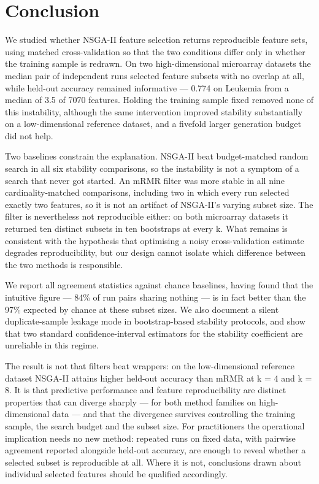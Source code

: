 \documentclass[conference]{IEEEtran}
\begin{document}
\section{Conclusion}

We studied whether NSGA-II feature selection returns reproducible feature sets, using matched cross-validation so that the two conditions differ only in whether the training sample is redrawn. On two high-dimensional microarray datasets the median pair of independent runs selected feature subsets with no overlap at all, while held-out accuracy remained informative --- 0.774 on Leukemia from a median of 3.5 of 7070 features. Holding the training sample fixed removed none of this instability, although the same intervention improved stability substantially on a low-dimensional reference dataset, and a fivefold larger generation budget did not help.

Two baselines constrain the explanation. NSGA-II beat budget-matched random search in all six stability comparisons, so the instability is not a symptom of a search that never got started. An mRMR filter was more stable in all nine cardinality-matched comparisons, including two in which every run selected exactly two features, so it is not an artifact of NSGA-II's varying subset size. The filter is nevertheless not reproducible either: on both microarray datasets it returned ten distinct subsets in ten bootstraps at every k. What remains is consistent with the hypothesis that optimising a noisy cross-validation estimate degrades reproducibility, but our design cannot isolate which difference between the two methods is responsible.

We report all agreement statistics against chance baselines, having found that the intuitive figure --- 84\% of run pairs sharing nothing --- is in fact better than the 97\% expected by chance at these subset sizes. We also document a silent duplicate-sample leakage mode in bootstrap-based stability protocols, and show that two standard confidence-interval estimators for the stability coefficient are unreliable in this regime.

The result is not that filters beat wrappers: on the low-dimensional reference dataset NSGA-II attains higher held-out accuracy than mRMR at k = 4 and k = 8. It is that predictive performance and feature reproducibility are distinct properties that can diverge sharply --- for both method families on high-dimensional data --- and that the divergence survives controlling the training sample, the search budget and the subset size. For practitioners the operational implication needs no new method: repeated runs on fixed data, with pairwise agreement reported alongside held-out accuracy, are enough to reveal whether a selected subset is reproducible at all. Where it is not, conclusions drawn about individual selected features should be qualified accordingly.
\end{document}

